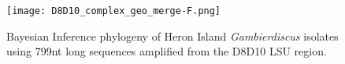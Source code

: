 \documentclass[12pt]{article}
\begin{document}
\newpage
\begin{figure} 
\texttt{[image: D8D10\_complex\_geo\_merge-F.png]} 
\caption{Bayesian Inference phylogeny of Heron Island \textit{Gambierdiscus} isolates using 799nt long sequences amplified from the D8D10 LSU region.} 
\label{fig:HGD8D10}
\end{figure} 
\FloatBarrier 
\newpage


\end{document}
